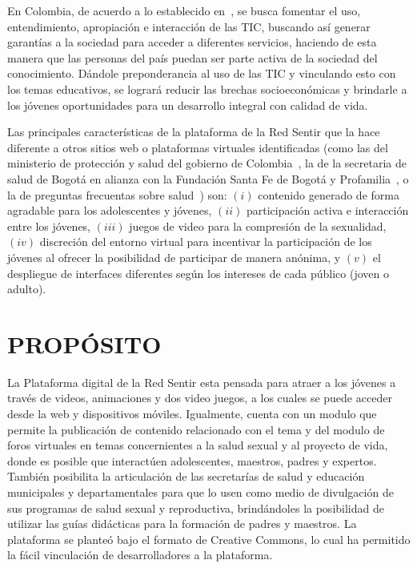 \documentclass[journal,transmag]{IEEEtran}
\begin{document}
En Colombia, de acuerdo a lo establecido en~\cite{Plan2014}, se busca fomentar el uso, entendimiento, apropiación e interacción de las TIC, buscando así generar garantías a la sociedad para acceder a diferentes servicios, haciendo de esta manera que las personas del país puedan ser parte activa de la sociedad del conocimiento. Dándole preponderancia al uso de las TIC y vinculando esto con los temas educativos, se logrará reducir las brechas socioeconómicas y brindarle a los jóvenes oportunidades para un desarrollo integral con calidad de vida.

Las principales características de la plataforma de la Red Sentir que la hace diferente a otros sitios web o plataformas virtuales identificadas (como las del ministerio de protección y salud del gobierno de Colombia~\cite{PagGob2018}, la de la secretaria de salud de Bogotá en alianza con la Fundación Santa Fe de Bogotá y Profamilia~\cite{Sexperto2018}, o la de preguntas frecuentas sobre salud~\cite{1DOC3}) son: $(i)$ contenido generado de forma agradable para los adolescentes y jóvenes, $(ii)$ participación activa e interacción entre los jóvenes, $(iii)$ juegos de video para la compresión de la sexualidad, $(iv)$ discreción del entorno virtual para incentivar la participación de los jóvenes al ofrecer la posibilidad de participar de manera anónima, y $(v)$ el despliegue de interfaces diferentes según los intereses de cada público (joven o adulto).  

\section{PROPÓSITO}\label{sec:propositos}

La Plataforma digital de la Red Sentir esta pensada para atraer a los jóvenes a través de videos, animaciones y dos video juegos, a los cuales se puede acceder desde la web y dispositivos móviles.  Igualmente, cuenta con un modulo que permite la publicación de contenido relacionado con el tema y del modulo de foros virtuales en temas concernientes a la salud sexual y al proyecto de vida, donde es posible que interactúen adolescentes, maestros, padres y expertos. También posibilita la articulación de las secretarías de salud y educación municipales y departamentales para que lo usen como medio de divulgación de sus programas de salud sexual y reproductiva, brindándoles la posibilidad de utilizar las guías didácticas para la formación de padres y maestros. La plataforma se planteó bajo el formato de Creative Commons, lo cual ha permitido la fácil vinculación de desarrolladores a la plataforma.
\end{document}
